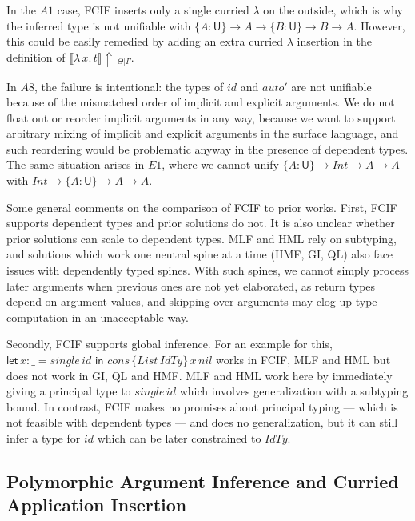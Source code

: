 \documentclass[acmsmall,review,anonymous,prologue,dvipsnames]{acmart}\settopmatter{printfolios=true,printccs=false,printacmref=false}
\newcommand{\slet}{\boldsymbol{\mathsf{let}}}
\renewcommand{\sin}{\boldsymbol{\mathsf{in}}}
\renewcommand{\U}{\mathsf{U}}
\newcommand{\mi}[1]{\mathit{#1}}
\newcommand{\einfer}[3]{\llbracket#1\rrbracket\!\Uparrow\,_{#2|#3}}
\theoremstyle{remark}
\begin{document}
In the $A1$ case, FCIF inserts only a single curried $\lambda$ on the outside,
which is why the inferred type is not unifiable with $\{A : \U\}\to A \to \{B :
\U\} \to B \to A$. However, this could be easily remedied by adding an extra
curried $\lambda$ insertion in the definition of
$\einfer{\lambda\,x.\,t}{\Theta}{\Gamma}$.

In $A8$, the failure is intentional: the types of $id$ and $auto'$ are not
unifiable because of the mismatched order of implicit and explicit arguments. We
do not float out or reorder implicit arguments in any way, because we want to
support arbitrary mixing of implicit and explicit arguments in the surface
language, and such reordering would be problematic anyway in the presence of
dependent types. The same situation arises in $E1$, where we cannot unify $\{A :
\U\}\to \mi{Int} \to A \to A$ with $\mi{Int} \to \{A : \U\}\to A \to A$.

Some general comments on the comparison of FCIF to prior works. First, FCIF
supports dependent types and prior solutions do not. It is also unclear whether
prior solutions can scale to dependent types. MLF and HML rely on subtyping, and
solutions which work one neutral spine at a time (HMF, GI, QL) also face issues
with dependently typed spines. With such spines, we cannot simply process later
arguments when previous ones are not yet elaborated, as return types depend on
argument values, and skipping over arguments may clog up type computation in an
unacceptable way.

Secondly, FCIF supports global inference. For an example for this, $\slet\,x :
\_ = \mi{single}\,\mi{id}\,\,\sin$ $\mi{cons}\,\{\mi{List}\,\mi{IdTy}\}\,x\,\mi{nil}$ works
in FCIF, MLF and HML but does not work in GI, QL and HMF. MLF and HML work here
by immediately giving a principal type to $\mi{single}\,\mi{id}$ which involves
generalization with a subtyping bound. In contrast, FCIF makes no promises about
principal typing --- which is not feasible with dependent types --- and does no
generalization, but it can still infer a type for $\mi{id}$ which can be later
constrained to $\mi{IdTy}$.

\subsection{Polymorphic Argument Inference and Curried Application Insertion}
\label{sec:appinsert}
\end{document}
